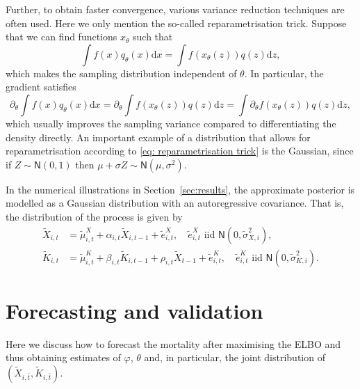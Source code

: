 \documentclass[preprint,12pt]{elsarticle}
\def\pp{\partial}
\def\dd{\ensuremath{\mathrm{d}}}
\begin{document}
Further, to obtain faster convergence, various variance reduction techniques are often used. Here we only mention the so-called reparametrisation trick. Suppose that we can find functions $x_\theta$ such that
\begin{equation}\label{eq: reparametrisation trick}
	\int f(x) q_\theta(x)\dd x = \int f(x_\theta(z))q(z)\dd z,
\end{equation}
which makes the sampling distribution independent of $\theta$. In particular, the gradient satisfies
\begin{equation}
	\partial_\theta \int f(x) q_\theta(x)\dd x = \partial_\theta \int f(x_\theta(z))q(z)\dd z = \int \pp_\theta f(x_\theta(z))q(z)\dd z,
\end{equation}
which usually improves the sampling variance compared to differentiating the density directly. An important example of a distribution that allows for reparametrisation according to \eqref{eq: reparametrisation trick} is the Gaussian, since if $Z\sim \mathsf N(0,1)$ then $\mu + \sigma Z\sim \mathsf N (\mu,\sigma^2)$.

In the numerical illustrations in Section~\ref{sec:results}, the approximate posterior is modelled as a Gaussian distribution with an autoregressive covariance. That is, the distribution of the process is given by
\begin{align}
	\tilde X_{i,t} &= \tilde\mu^X_{i,t } + \alpha_{i,t}\tilde X_{i,t-1}  + \tilde e^X_{i,t},\quad \tilde e^X_{i,t} \text{ iid } \mathsf N(0,\tilde\sigma^2_{X,i}),\\
	\tilde K_{i,t} &= \tilde \mu^K_{i,t} + \beta_{i,t}\tilde K_{i,t-1} + \rho_{i,t}\tilde X_{t-1} + \tilde e^K_{i,t},\quad \tilde e^K_{i,t} \text{ iid } \mathsf N(0,\tilde \sigma^2_{K,i}).
\end{align}

\section{Forecasting and validation}\label{sec:forecastValidation}
Here we discuss how to forecast the mortality after maximising the ELBO and thus obtaining estimates of $\varphi$, $\theta$ and, in particular, the joint distribution of $(\tilde X_{i,\bar t},\tilde K_{i,\bar t})$.
\end{document}

